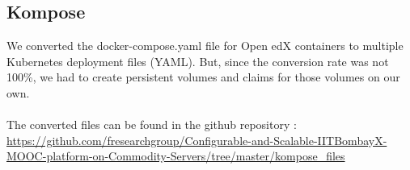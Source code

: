 \documentclass[12pt]{article}
\begin{document}
\subsection{Kompose}
We converted the docker-compose.yaml file for Open edX containers to multiple Kubernetes deployment files (YAML). But, since the conversion rate was not 100\%, we had to create persistent volumes and claims for those volumes on our own.\\\\
The converted files can be found in the github repository : \\ \href{https://github.com/fresearchgroup/Configurable-and-Scalable-IITBombayX-MOOC-platform-on-Commodity-Servers/tree/master/kompose_files}{https://github.com/fresearchgroup/Configurable-and-Scalable-IITBombayX-MOOC-platform-on-Commodity-Servers/tree/master/kompose\_files} \cite{Komposefiles}
\end{document}
